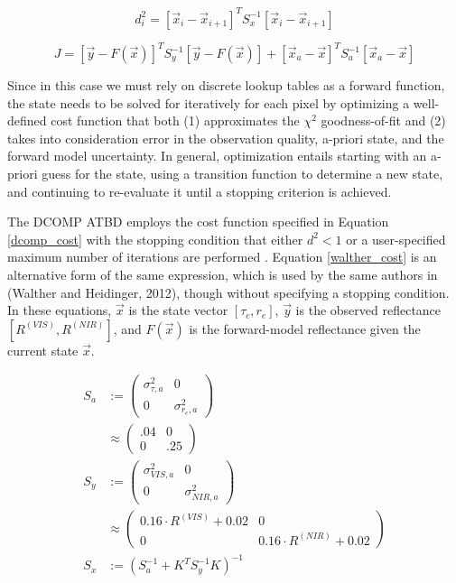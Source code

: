 \documentclass[12pt]{article}
\begin{document}
\begin{equation}\label{dcomp_cost}
    d^2_i = \left[\vec{x}_i-\vec{x}_{i+1}\right]^TS_x^{-1}\left[\vec{x}_i-\vec{x}_{i+1}\right]
\end{equation}

\begin{equation}\label{walther_cost}
    J = \left[\vec{y}-F(\vec{x})\right]^TS_y^{-1}\left[\vec{y}-F(\vec{x})\right] + \left[\vec{x}_a - \vec{x}\right]^T S_a^{-1} \left[\vec{x}_a - \vec{x}\right]
\end{equation}

Since in this case we must rely on discrete lookup tables as a forward function, the state needs to be solved for iteratively for each pixel by optimizing a well-defined cost function that both (1) approximates the $\chi^2$ goodness-of-fit and (2) takes into consideration error in the observation quality, a-priori state, and the forward model uncertainty. In general, optimization entails starting with an a-priori guess for the state, using a transition function to determine a new state, and continuing to re-evaluate it until a stopping criterion is achieved.

The DCOMP ATBD employs the cost function specified in Equation \ref{dcomp_cost} with the stopping condition that either $d^2 < 1$ or a user-specified maximum number of iterations are performed \cite{uw_algorithm_nodate}. Equation \ref{walther_cost} is an alternative form of the same expression, which is used by the same authors in (Walther and Heidinger, 2012), though without specifying a stopping condition. \cite{walther_implementation_2012} In these equations, $\vec{x}$ is the state vector $[\tau_c, r_e]$, $\vec{y}$ is the observed reflectance $[R^{(VIS)}, R^{(NIR)}]$, and $F(\vec{x})$ is the forward-model reflectance given the current state $\vec{x}$.

\begin{equation}\label{err_mats}
    \begin{split}
        S_a &:= \begin{pmatrix}\sigma^2_{\tau, a} & 0 \\ 0 & \sigma^2_{r_e, a}\end{pmatrix} \\
            & \approx \begin{pmatrix} .04 & 0 \\ 0 & .25\end{pmatrix} \\
        S_y &:= \begin{pmatrix}\sigma^2_{VIS, a} & 0 \\ 0 & \sigma^2_{NIR, a}\end{pmatrix} \\
            &\approx \begin{pmatrix} 0.16\cdot R^{(VIS)}+0.02 & 0 \\ 0 & 0.16\cdot R^{(NIR)}+0.02\end{pmatrix} \\
        S_x &:= \left(S_a^{-1} + K^TS_y^{-1}K\right)^{-1}
    \end{split}
\end{equation}
\end{document}
